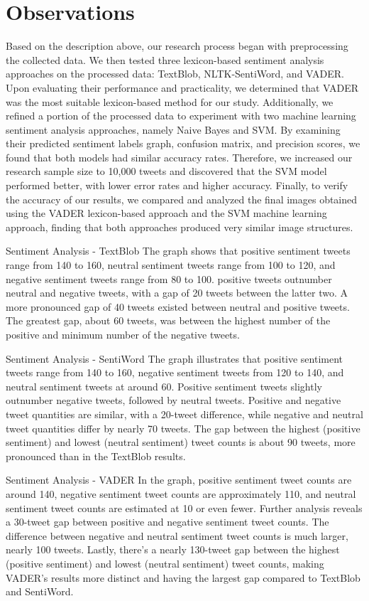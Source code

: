 \documentclass[12pt,titlepage]{article}
\begin{document}
\section{Observations}
Based on the description above, our research process began with preprocessing the collected data. We then tested three lexicon-based sentiment analysis approaches on the processed data: TextBlob, NLTK-SentiWord, and VADER. Upon evaluating their performance and practicality, we determined that VADER was the most suitable lexicon-based method for our study. Additionally, we refined a portion of the processed data to experiment with two machine learning sentiment analysis approaches, namely Naive Bayes and SVM. By examining their predicted sentiment labels graph, confusion matrix, and precision scores, we found that both models had similar accuracy rates. Therefore, we increased our research sample size to 10,000 tweets and discovered that the SVM model performed better, with lower error rates and higher accuracy. Finally, to verify the accuracy of our results, we compared and analyzed the final images obtained using the VADER lexicon-based approach and the SVM machine learning approach, finding that both approaches produced very similar image structures.

Sentiment Analysis - TextBlob
The graph shows that positive sentiment tweets range from 140 to 160, neutral sentiment tweets range from 100 to 120, and negative sentiment tweets range from 80 to 100. positive tweets outnumber neutral and negative tweets, with a gap of 20 tweets between the latter two. A more pronounced gap of 40 tweets existed between neutral and positive tweets. The greatest gap, about 60 tweets, was between the highest number of the positive and minimum number of the negative tweets.

Sentiment Analysis - SentiWord
The graph illustrates that positive sentiment tweets range from 140 to 160, negative sentiment tweets from 120 to 140, and neutral sentiment tweets at around 60. Positive sentiment tweets slightly outnumber negative tweets, followed by neutral tweets. Positive and negative tweet quantities are similar, with a 20-tweet difference, while negative and neutral tweet quantities differ by nearly 70 tweets. The gap between the highest (positive sentiment) and lowest (neutral sentiment) tweet counts is about 90 tweets, more pronounced than in the TextBlob results.

Sentiment Analysis - VADER
In the graph, positive sentiment tweet counts are around 140, negative sentiment tweet counts are approximately 110, and neutral sentiment tweet counts are estimated at 10 or even fewer. Further analysis reveals a 30-tweet gap between positive and negative sentiment tweet counts. The difference between negative and neutral sentiment tweet counts is much larger, nearly 100 tweets. Lastly, there's a nearly 130-tweet gap between the highest (positive sentiment) and lowest (neutral sentiment) tweet counts, making VADER's results more distinct and having the largest gap compared to TextBlob and SentiWord.
\end{document}
